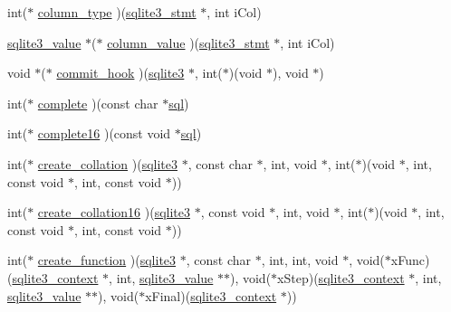 \begin{DoxyCompactItemize}
\item 
int($\ast$ \hyperlink{structsqlite3__api__routines_a1bfa18703e814caf9b940bd89247fde5}{column\-\_\-type} )(\hyperlink{sqlite3_8c_af2a033da1327cdd77f0a174a09aedd0c}{sqlite3\-\_\-stmt} $\ast$, int i\-Col)
\item 
\hyperlink{sqlite3_8c_a5bc19e6eab34ccccd953717c04137d88}{sqlite3\-\_\-value} $\ast$($\ast$ \hyperlink{structsqlite3__api__routines_a2c5ab2f4eb5458dd17922e6ad6f33ca3}{column\-\_\-value} )(\hyperlink{sqlite3_8c_af2a033da1327cdd77f0a174a09aedd0c}{sqlite3\-\_\-stmt} $\ast$, int i\-Col)
\item 
void $\ast$($\ast$ \hyperlink{structsqlite3__api__routines_a1fd4d534756988a2d709acffeb91d68a}{commit\-\_\-hook} )(\hyperlink{structsqlite3}{sqlite3} $\ast$, int($\ast$)(void $\ast$), void $\ast$)
\item 
int($\ast$ \hyperlink{structsqlite3__api__routines_a4bd1a90b2a40c58ecc1c2ceb67be48f5}{complete} )(const char $\ast$\hyperlink{structsqlite3__api__routines_aca8e71f936e7e8c822588b82687ab129}{sql})
\item 
int($\ast$ \hyperlink{structsqlite3__api__routines_ae3e27f61b6c43cf549360f1bb8b3b591}{complete16} )(const void $\ast$\hyperlink{structsqlite3__api__routines_aca8e71f936e7e8c822588b82687ab129}{sql})
\item 
int($\ast$ \hyperlink{structsqlite3__api__routines_aed840be5b7cc7add4f21ba88f1981f58}{create\-\_\-collation} )(\hyperlink{structsqlite3}{sqlite3} $\ast$, const char $\ast$, int, void $\ast$, int($\ast$)(void $\ast$, int, const void $\ast$, int, const void $\ast$))
\item 
int($\ast$ \hyperlink{structsqlite3__api__routines_a2f05772713bb942bff670352a96ee1e6}{create\-\_\-collation16} )(\hyperlink{structsqlite3}{sqlite3} $\ast$, const void $\ast$, int, void $\ast$, int($\ast$)(void $\ast$, int, const void $\ast$, int, const void $\ast$))
\item 
int($\ast$ \hyperlink{structsqlite3__api__routines_aaf30781efad4fb70111f391e6fe20a9c}{create\-\_\-function} )(\hyperlink{structsqlite3}{sqlite3} $\ast$, const char $\ast$, int, int, void $\ast$, void($\ast$x\-Func)(\hyperlink{structsqlite3__context}{sqlite3\-\_\-context} $\ast$, int, \hyperlink{sqlite3_8c_a5bc19e6eab34ccccd953717c04137d88}{sqlite3\-\_\-value} $\ast$$\ast$), void($\ast$x\-Step)(\hyperlink{structsqlite3__context}{sqlite3\-\_\-context} $\ast$, int, \hyperlink{sqlite3_8c_a5bc19e6eab34ccccd953717c04137d88}{sqlite3\-\_\-value} $\ast$$\ast$), void($\ast$x\-Final)(\hyperlink{structsqlite3__context}{sqlite3\-\_\-context} $\ast$))

\end{DoxyCompactItemize}

